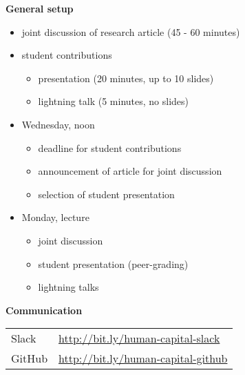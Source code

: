 \begin{frame}\textbf{General setup}\vspace{0.5cm}

\begin{itemize}\setlength\itemsep{1em}
\item joint discussion of research article (45 - 60 minutes)
\item student contributions\medskip
\begin{itemize}\setlength\itemsep{1em}
  \item presentation (20 minutes, up to 10 slides)
  \item lightning talk (5 minutes, no slides)
\end{itemize}
\end{itemize}

\end{frame}
\begin{frame}

\begin{itemize}\setlength\itemsep{1em}
  \item Wednesday, noon\medskip
  \begin{itemize}\setlength\itemsep{1em}
    \item deadline for student contributions
    \item announcement of article for joint discussion
    \item selection of student presentation
  \end{itemize}
  \item Monday, lecture\medskip
  \begin{itemize}\setlength\itemsep{1em}
    \item joint discussion
    \item student presentation (peer-grading)
    \item lightning talks
  \end{itemize}
\end{itemize}
\end{frame}
\begin{frame}
\textbf{Communication}\\\vspace{0.5cm}
\begin{tabular}{ll}
Slack     & \url{http://bit.ly/human-capital-slack} \\
GitHub    & \url{http://bit.ly/human-capital-github} \\
\end{tabular}
\end{frame}
